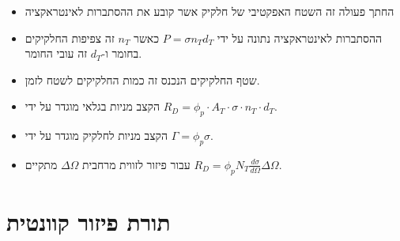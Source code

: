 \documentclass{tstextbook}
\begin{document}
\begin{summary}
  \begin{itemize}
    \item החתך פעולה זה השטח האפקטיבי של חלקיק אשר קובע את ההסתברות לאינטראקציה
    \item ההסתברות לאינטראקציה נתונה על ידי \(P=\sigma n_{T}d_{T}\) כאשר \(n_{T}\) זה צפיפות החלקיקים בחומר ו-\(d_{T}\) זה עובי החומר.
    \item שטף החלקיקים הנכנס זה כמות החלקיקים לשטח לזמן. 
    \item הקצב מניות בגלאי מוגדר על ידי \(R_{D}=\phi_{p}\cdot A_{T}\cdot \sigma \cdot n_{T}\cdot d_{T}\).
    \item הקצב מניות לחלקיק מוגדר על ידי \(\Gamma=\phi_{p}\sigma\).
    \item עבור פיזור לזווית מרחבית \(\Delta \Omega\) מתקיים \(R_{D}=\phi_{p}N_{T}\frac{d\sigma}{d\Omega}\Delta\Omega\).
  \end{itemize}
\end{summary}
\section{תורת פיזור קוונטית}
\end{document}
